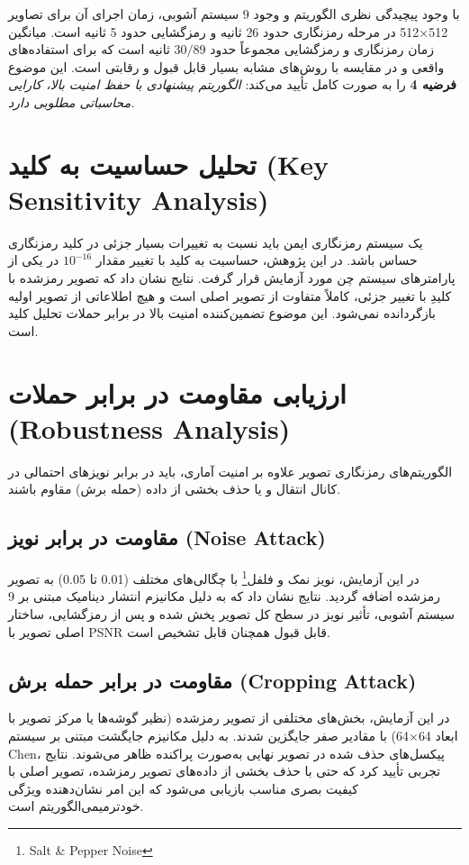 \documentclass[a4paper,12pt]{report}
\renewcommand{\%}{\lr{\oldpercent}}
\providecommand{\lr}[1]{#1}
\providecommand{\LTRfootnote}[1]{\footnote{#1}}
\begin{document}
با وجود پیچیدگی نظری الگوریتم و وجود 9 سیستم آشوبی، زمان اجرای آن برای تصاویر 512×512 در مرحله رمزنگاری حدود 26 ثانیه و رمزگشایی حدود 5 ثانیه است. میانگین زمان رمزنگاری و رمزگشایی مجموعاً حدود $30/89$ ثانیه است که برای استفاده‌های واقعی و در مقایسه با روش‌های مشابه بسیار قابل قبول و رقابتی است. این موضوع \textbf{فرضیه 4} را به صورت کامل تأیید می‌کند: \textit{الگوریتم پیشنهادی با حفظ امنیت بالا، کارایی محاسباتی مطلوبی دارد.}

\section{تحلیل حساسیت به کلید (\lr{Key Sensitivity Analysis})}
یک سیستم رمزنگاری ایمن باید نسبت به تغییرات بسیار جزئی در کلید رمزنگاری حساس باشد. در این پژوهش، حساسیت به کلید با تغییر مقدار $10^{-16}$ در یکی از پارامترهای سیستم چن مورد آزمایش قرار گرفت. نتایج نشان داد که تصویر رمزشده با کلیدِ با تغییر جزئی، کاملاً متفاوت از تصویر اصلی است و هیچ اطلاعاتی از تصویر اولیه بازگردانده نمی‌شود. این موضوع تضمین‌کننده امنیت بالا در برابر حملات تحلیل کلید است.

\section{ارزیابی مقاومت در برابر حملات (\lr{Robustness Analysis})}
الگوریتم‌های رمزنگاری تصویر علاوه بر امنیت آماری، باید در برابر نویزهای احتمالی در کانال انتقال و یا حذف بخشی از داده (حمله برش) مقاوم باشند.

\subsection{مقاومت در برابر نویز (\lr{Noise Attack})}
در این آزمایش، نویز نمک و فلفل\LTRfootnote{Salt \& Pepper Noise} با چگالی‌های مختلف (0.01 تا 0.05) به تصویر رمزشده اضافه گردید. نتایج نشان داد که به دلیل مکانیزم انتشار دینامیک مبتنی بر 9 سیستم آشوبی، تأثیر نویز در سطح کل تصویر پخش شده و پس از رمزگشایی، ساختار اصلی تصویر با \lr{PSNR} قابل قبول همچنان قابل تشخیص است.

\subsection{مقاومت در برابر حمله برش (\lr{Cropping Attack})}
در این آزمایش، بخش‌های مختلفی از تصویر رمزشده (نظیر گوشه‌ها یا مرکز تصویر با ابعاد 64×64) با مقادیر صفر جایگزین شدند. به دلیل مکانیزم جایگشت مبتنی بر سیستم \lr{Chen}، پیکسل‌های حذف شده در تصویر نهایی به‌صورت پراکنده ظاهر می‌شوند. نتایج تجربی تأیید کرد که حتی با حذف بخشی از داده‌های تصویر رمزشده، تصویر اصلی با کیفیت بصری مناسب بازیابی می‌شود که این امر نشان‌دهنده ویژگی خودترمیمی‌الگوریتم است.
\end{document}
